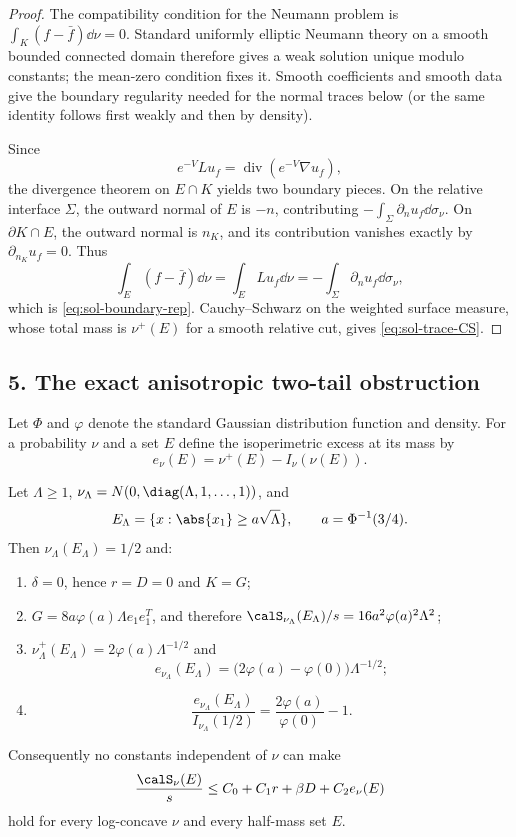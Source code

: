 \documentclass[../main.tex]{subfiles}
\begin{document}
\begin{proof}
The compatibility condition for the Neumann problem is
$\int_K(f-\bar f)\dd\nu=0$.  Standard uniformly elliptic Neumann theory on a smooth bounded
connected domain therefore gives a weak solution unique modulo constants; the mean-zero
condition fixes it.  Smooth coefficients and smooth data give the boundary regularity needed
for the normal traces below (or the same identity follows first weakly and then by density).

Since
\[
 e^{-V}Lu_f=\operatorname{div}(e^{-V}\nabla u_f),
\]
the divergence theorem on $E\cap K$ yields two boundary pieces.  On the relative interface
$\Sigma$, the outward normal of $E$ is $-n$, contributing
$-\int_\Sigma\partial_nu_f\dd\sigma_\nu$.  On $\partial K\cap E$, the outward normal is
$n_K$, and its contribution vanishes exactly by $\partial_{n_K}u_f=0$.  Thus
\[
 \int_E(f-\bar f)\dd\nu
 =\int_E Lu_f\dd\nu
 =-\int_\Sigma\partial_nu_f\dd\sigma_\nu,
\]
which is \eqref{eq:sol-boundary-rep}.  Cauchy--Schwarz on the weighted surface measure, whose
total mass is $\nu^+(E)$ for a smooth relative cut, gives \eqref{eq:sol-trace-CS}.
\end{proof}

\subsection*{5. The exact anisotropic two-tail obstruction}

Let $\Phi$ and $\varphi$ denote the standard Gaussian distribution function and density.  For
a probability $\nu$ and a set $E$ define the isoperimetric excess at its mass by
\[
 e_\nu(E)=\nu^+(E)-I_\nu(\nu(E)).
\]

\begin{proposition}[= Proposition~\ref{prop:two-tail}]
\label{prop:sol-two-tail}
Let $\Lambda\ge1$,
$\nu_\Lambda=N(0,\diag(\Lambda,1,\ldots,1))$, and
\[
 E_\Lambda=\{x:\abs{x_1}\ge a\sqrt\Lambda\},
 \qquad a=\Phi^{-1}(3/4).
\]
Then $\nu_\Lambda(E_\Lambda)=1/2$ and:
\begin{enumerate}[label=(\roman*),leftmargin=2.2em]
 \item $\delta=0$, hence $r=D=0$ and $K=G$;
 \item $G=8a\varphi(a)\Lambda e_1e_1^T$, and therefore
 $\calS_{\nu_\Lambda}(E_\Lambda)/s
   =16a^2\varphi(a)^2\Lambda^2$;
 \item $\nu_\Lambda^+(E_\Lambda)=2\varphi(a)\Lambda^{-1/2}$ and
 \[
 e_{\nu_\Lambda}(E_\Lambda)
 =\bigl(2\varphi(a)-\varphi(0)\bigr)\Lambda^{-1/2};
 \]
 \item
 \[
 \frac{e_{\nu_\Lambda}(E_\Lambda)}{I_{\nu_\Lambda}(1/2)}
 =\frac{2\varphi(a)}{\varphi(0)}-1.
 \]
\end{enumerate}
Consequently no constants independent of $\nu$ can make
\[
 \frac{\calS_\nu(E)}s\le C_0+C_1r+\beta D+C_2e_\nu(E)
\]
hold for every log-concave $\nu$ and every half-mass set $E$.
\end{proposition}
\end{document}
